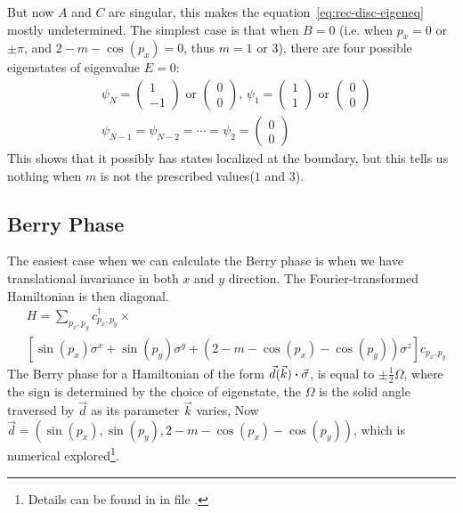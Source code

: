 \documentclass{article}
\begin{document}
    But now $A$ and $C$ are singular, this makes the
    equation~\ref{eq:rec-disc-eigeneq} mostly undetermined. The simplest case is
    that when $B=0$ (i.e. when $p_x=0$ or $\pm \pi$, and $2-m-\cos(p_x)=0$, thus
    $m=1$ or $3$),
    there are four possible eigenstates of eigenvalue $E=0$:
    \begin{align}
        &\psi_N = \begin{pmatrix}
            1 \\ -1
        \end{pmatrix}\text{ or } \begin{pmatrix}
            0 \\ 0
        \end{pmatrix},\,
        \psi_1 = \begin{pmatrix}
            1 \\ 1
        \end{pmatrix}\text{ or } \begin{pmatrix}
            0 \\ 0
        \end{pmatrix}\nonumber\\
        &\psi_{N-1}=\psi_{N-2} = \cdots = \psi_2 = \begin{pmatrix}
            0 \\ 0
        \end{pmatrix}
    \end{align}
    This shows that it possibly has states localized at the boundary, but this
    tells us nothing when $m$ is not the prescribed values($1$ and $3$).

    \subsection{Berry Phase}
    \label{sec:Berry Phase}
    The easiest case when we can calculate the Berry phase is when we have
    translational invariance in both $x$ and $y$ direction. The
    Fourier-transformed Hamiltonian is then diagonal. 
    \begin{align}
        &H =\sum_{p_x,p_y} c^\dagger_{p_x,p_y}\times
        \nonumber\\
        &\left[ \sin(p_x)\sigma^x + \sin(p_y)\sigma^y
            +(2-m-\cos(p_x)-\cos(p_y))\sigma^z
        \right] c_{p_x,p_y}
    \end{align}
    The Berry phase for a Hamiltonian of the form
    $\vec{d}(\vec{k})\vdot\vec{\sigma}$, is equal to $\pm\frac{1}{2}\Omega$,
    where the sign is determined by the choice of eigenstate, the $\Omega$ is
    the solid angle traversed by $\vec{d}$ as its parameter $\vec{k}$ varies,
    Now $\vec{d}=(\sin(p_x),\sin(p_y),2-m-\cos(p_x)-\cos(p_y))$, which is
    numerical explored\footnote{Details can be found in in file .}.
\end{document}
